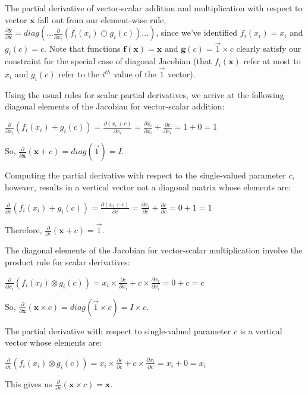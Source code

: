 \documentclass[11pt]{article}
\begin{document}
The partial derivative of vector-scalar addition and multiplication with respect to vector $\mathbf{x}$  fall out from our element-wise rule, $\frac{\partial \mathbf{y}}{\partial \mathbf{x}} = diag \left( \ldots \frac{\partial}{\partial x_i} ( f_i(x_i) \bigcirc g_i(c) ) \ldots \right)$, since we've identified $f_i(x_i) = x_i$ and $g_i(c) = c$. Note that functions $\mathbf{f(x)} = \mathbf{x}$ and $\mathbf{g}(c) = \vec{1} \times c$ clearly satisfy our constraint for the special case of diagonal Jacobian (that $f_i(\mathbf{x})$ refer at most to $x_i$ and $g_i(c)$ refer to the $i^{th}$ value of the $\vec{1}$ vector). 

Using the usual rules for scalar partial derivatives, we arrive at the following diagonal elements of the Jacobian for vector-scalar addition:
 
$\frac{\partial}{\partial x_i} ( f_i(x_i) + g_i(c) ) = \frac{\partial (x_i + c)}{\partial x_i} = \frac{\partial x_i}{\partial x_i} + \frac{\partial c}{\partial x_i} = 1 + 0 = 1$

So, $\frac{\partial}{\partial \mathbf{x}} ( \mathbf{x} + c ) = diag(\vec{1}) = I$.

Computing the partial derivative with respect to the single-valued parameter $c$, however, results in a vertical vector not a diagonal matrix whose elements are:
 
$\frac{\partial}{\partial c} ( f_i(x_i) + g_i(c) ) = \frac{\partial (x_i + c)}{\partial c} = \frac{\partial x_i}{\partial c} + \frac{\partial c}{\partial c} = 0 + 1 = 1$

Therefore, $\frac{\partial}{\partial c} ( \mathbf{x} + c ) = \vec{1}$.

The diagonal elements of the Jacobian for vector-scalar multiplication involve the product rule for scalar derivatives:

$\frac{\partial}{\partial x_i} ( f_i(x_i) \otimes g_i(c) ) = x_i \times \frac{\partial c}{\partial x_i} + c \times \frac{\partial x_i}{\partial x_i} = 0 + c = c$

So, $\frac{\partial}{\partial \mathbf{x}} ( \mathbf{x} \times c ) = diag(\vec{1} \times c) = I \times c$. 

The partial derivative with respect to single-valued parameter $c$ is a vertical vector whose elements are:

$\frac{\partial}{\partial c} ( f_i(x_i) \otimes g_i(c) ) = x_i \times \frac{\partial c}{\partial c} + c \times \frac{\partial x_i}{\partial c} = x_i + 0 = x_i$

This gives us $\frac{\partial}{\partial c} ( \mathbf{x} \times c ) = \mathbf{x}$.
\end{document}
